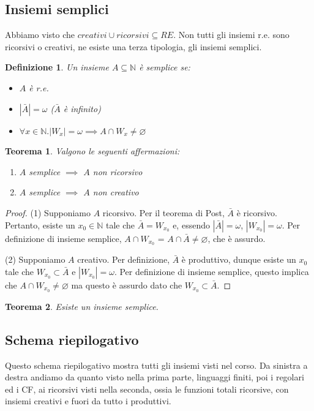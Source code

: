 \documentclass[a4paper,titlepage]{article}
\newtheorem{theorem}{Teorema}[section]
\newtheorem{definition}{Definizione}[section]
\theoremstyle{definition}
\newcommand{\N}{\mathbb{N}}
\begin{document}
\subsection{Insiemi semplici}
Abbiamo visto che $creativi\cup ricorsivi\subseteq RE$. Non tutti gli insiemi r.e. sono ricorsivi o creativi, ne esiste una terza tipologia, gli insiemi semplici. 
\begin{definition}
	Un insieme $A\subseteq\N$ è semplice se:
	\begin{itemize}
		\item $A$ è r.e.
		\item $|\bar A|=\omega$ ($\bar A$ è infinito)
		\item $\forall x\in\N.|W_x|=\omega\implies A\cap W_x\neq\varnothing$
	\end{itemize}
\end{definition}
\begin{theorem}
	Valgono le seguenti affermazioni:
	\begin{enumerate}[(1)]
		\item $A$ semplice $\implies$ $A$ non ricorsivo 
		\item $A$ semplice $\implies$ $A$ non creativo
	\end{enumerate}
\end{theorem}
\begin{proof}
	(1) Supponiamo $A$ ricorsivo. Per il teorema di Post, $\bar A$ è ricorsivo. Pertanto, esiste un $x_0\in\N$ tale che $\bar A=W_{x_0}$ e, essendo $|\bar A|=\omega$, $|W_{x_0}|=\omega$. Per definizione di insieme semplice, $A\cap W_{x_0}$ = $A\cap\bar A\neq\varnothing$, che è assurdo. 
	
	(2) Supponiamo $A$ creativo. Per definizione, $\bar A$ è produttivo, dunque esiste un $x_0$ tale che $W_{x_0}\subset\bar A$ e $|W_{x_0}|=\omega$. Per definizione di insieme semplice, questo implica che $A\cap W_{x_0}\neq\varnothing$ ma questo è assurdo dato che $W_{x_0}\subset\bar A$.
\end{proof}

\begin{theorem}
	Esiste un insieme semplice. 
\end{theorem}
\subsection{Schema riepilogativo}
Questo schema riepilogativo mostra tutti gli insiemi visti nel corso. Da sinistra a destra andiamo da quanto visto nella prima parte, linguaggi finiti, poi i regolari ed i CF, ai ricorsivi visti nella seconda, ossia le funzioni totali ricorsive,  con insiemi creativi e fuori da tutto i produttivi. 
\end{document}
